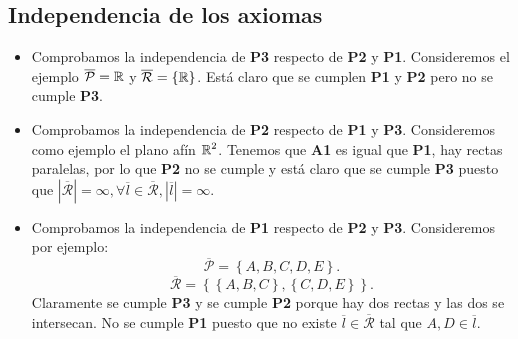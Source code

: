 \subsection{Independencia de los axiomas}
\begin{itemize}
	\item Comprobamos la independencia de \textbf{P3} respecto de \textbf{P2} y \textbf{P1}. Consideremos el ejemplo $\displaystyle \overline{\mathcal{P}}= \mathbb{R} $ y $\displaystyle \overline{\mathcal{R}} = \left\{ \mathbb{R}\right\} $. Está claro que se cumplen \textbf{P1} y \textbf{P2} pero no se cumple \textbf{P3}.
	\item Comprobamos la independencia de \textbf{P2} respecto de \textbf{P1} y \textbf{P3}. Consideremos como ejemplo el plano afín $\displaystyle \mathbb{R}^{2} $. Tenemos que \textbf{A1} es igual que \textbf{P1}, hay rectas paralelas, por lo que \textbf{P2} no se cumple y está claro que se cumple \textbf{P3} puesto que $\displaystyle \left|\overline{\mathcal{R}}\right| = \infty, \forall \overline{l} \in \overline{\mathcal{R}} , \left|\overline{l}\right|=\infty$.
	\item Comprobamos la independencia de \textbf{P1} respecto de \textbf{P2} y \textbf{P3}. Consideremos por ejemplo:
		\[\overline{\mathcal{P}} = \left\{ A, B, C, D, E\right\}  .\]
		\[\overline{\mathcal{R}} = \left\{ \left\{ A, B, C\right\}, \left\{ C, D, E\right\} \right\}  .\]
Claramente se cumple \textbf{P3} y se cumple \textbf{P2} porque hay dos rectas y las dos se intersecan. No se cumple \textbf{P1} puesto que no existe $\displaystyle \overline{l} \in \overline{\mathcal{R}} $ tal que $\displaystyle A , D \in \overline{l} $.
\end{itemize}
